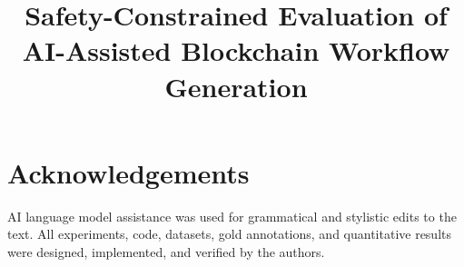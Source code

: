 \documentclass[conference]{IEEEtran}
\title{Safety-Constrained Evaluation of AI-Assisted Blockchain Workflow Generation}
\author{
\IEEEauthorblockN{Anonymous Authors}
\IEEEauthorblockA{Paper draft for ICSTCEE 2026 fallback}
}
\begin{document}
\maketitle

\begin{abstract}

\end{abstract}











\section*{Acknowledgements}
AI language model assistance was used for grammatical and stylistic edits
to the text. All experiments, code, datasets, gold annotations, and
quantitative results were designed, implemented, and verified by the
authors.



\end{document}
